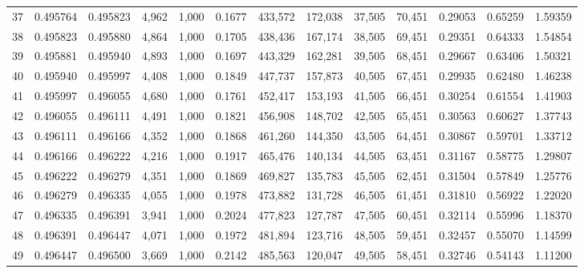 \begin{tabular}{rrrrrrrrrrrrr}
37  &  0.495764 &  0.495823 &   4,962 &  1,000 &                                     0.1677 &  433,572 &  172,038 &   37,505 &   70,451 &  0.29053 &  0.65259 &  1.59359 \\
38  &  0.495823 &  0.495880 &   4,864 &  1,000 &                                     0.1705 &  438,436 &  167,174 &   38,505 &   69,451 &  0.29351 &  0.64333 &  1.54854 \\
39  &  0.495881 &  0.495940 &   4,893 &  1,000 &                                     0.1697 &  443,329 &  162,281 &   39,505 &   68,451 &  0.29667 &  0.63406 &  1.50321 \\
40  &  0.495940 &  0.495997 &   4,408 &  1,000 &                                     0.1849 &  447,737 &  157,873 &   40,505 &   67,451 &  0.29935 &  0.62480 &  1.46238 \\
41  &  0.495997 &  0.496055 &   4,680 &  1,000 &                                     0.1761 &  452,417 &  153,193 &   41,505 &   66,451 &  0.30254 &  0.61554 &  1.41903 \\
42  &  0.496055 &  0.496111 &   4,491 &  1,000 &                                     0.1821 &  456,908 &  148,702 &   42,505 &   65,451 &  0.30563 &  0.60627 &  1.37743 \\
43  &  0.496111 &  0.496166 &   4,352 &  1,000 &                                     0.1868 &  461,260 &  144,350 &   43,505 &   64,451 &  0.30867 &  0.59701 &  1.33712 \\
44  &  0.496166 &  0.496222 &   4,216 &  1,000 &                                     0.1917 &  465,476 &  140,134 &   44,505 &   63,451 &  0.31167 &  0.58775 &  1.29807 \\
45  &  0.496222 &  0.496279 &   4,351 &  1,000 &                                     0.1869 &  469,827 &  135,783 &   45,505 &   62,451 &  0.31504 &  0.57849 &  1.25776 \\
46  &  0.496279 &  0.496335 &   4,055 &  1,000 &                                     0.1978 &  473,882 &  131,728 &   46,505 &   61,451 &  0.31810 &  0.56922 &  1.22020 \\
47  &  0.496335 &  0.496391 &   3,941 &  1,000 &                                     0.2024 &  477,823 &  127,787 &   47,505 &   60,451 &  0.32114 &  0.55996 &  1.18370 \\
48  &  0.496391 &  0.496447 &   4,071 &  1,000 &                                     0.1972 &  481,894 &  123,716 &   48,505 &   59,451 &  0.32457 &  0.55070 &  1.14599 \\
49  &  0.496447 &  0.496500 &   3,669 &  1,000 &                                     0.2142 &  485,563 &  120,047 &   49,505 &   58,451 &  0.32746 &  0.54143 &  1.11200 \\

\end{tabular}
